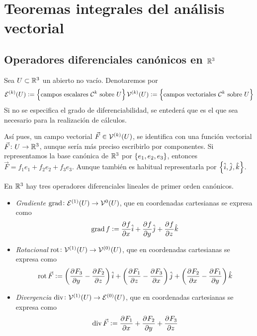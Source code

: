 \chapter{Teoremas integrales del análisis vectorial}

\section{Operadores diferenciales canónicos en $\mathbb{R}^3$}

\begin{obs}
    Sea $U \subset \mathbb{R}^3$ un abierto no vacío. Denotaremos por
    \begin{gather*}
        \mathcal{E}^{(k)} (U) := \left\{\text{campos escalares $\mathcal{C}^k$ sobre $U$}\right\}
        \mathcal{V}^{(k)}(U) := \left\{\text{campos vectoriales $\mathcal{C}^k$ sobre $U$}\right\}
    \end{gather*}
    Si no se especifica el grado de diferenciabilidad, se entederá que es el que sea necesario para la realización
    de cálculos.

    Así pues, un campo vectorial $\vec{F} \in \mathcal{V}^{\left( k \right)}(U)$, se identifica con una función vectorial
    $\vec{F} \colon U \to \mathbb{R}^3$, aunque sería más preciso escribirlo por componentes. Si representamos
    la base canónica de $\mathbb{R}^3$ por $\left\{e_1, e_2, e_3\right\}$, entonces $\vec{F} = f_1e_1 + f_2e_2 + f_3e_3$.
    Aunque tambi\'en es habitual representarla por $\left\{\hat{i}, \hat{j}, \hat{k}\right\}$.
\end{obs}

\begin{defi}
    En $\mathbb{R}^3$ hay tres operadores diferenciales lineales de primer orden canónicos.
    \begin{itemize}
 
        \item \emph{Gradiente} $\operatorname{grad} \colon \mathcal{E}^{(1)}(U) \to \mathcal{V}^{0}(U)$, que en coordenadas cartesianas
            se expresa como
            \[
                \operatorname{grad} f := \frac{\partial^{} f}{\partial x^{}} \hat{i} + \frac{\partial^{} f}{\partial y^{}} \hat{j} + \frac{\partial^{} f}{\partial z^{}} \hat{k}
            \]
        \item \emph{Rotacional} $\operatorname{rot} \colon \mathcal{V}^{(1)} (U) \to \mathcal{V}^{(0)}(U)$, que en coordenadas cartesianas
            se expresa como
            \[
                \operatorname{rot} \vec{F} := \left( \frac{\partial^{} F_3}{\partial y^{}} - \frac{\partial^{} F_2}{\partial z^{}} \right)\hat{i} +
                \left( \frac{\partial^{} F_1}{\partial z^{}} - \frac{\partial^{} F_3}{\partial x^{}} \right) \hat{j} + \left( \frac{\partial^{} F_2}{\partial x^{}} - \frac{\partial^{} F_1}{\partial y^{}} \right) \hat{k}
            \]
        \item \emph{Divergencia} $\operatorname{div} \colon \mathcal{V}^{(1)} (U) \to \mathcal{E}^{(0)} (U)$, que en coordenadas cartesianas
            se expresa como
            \[
                \operatorname{div} \vec{F} := \frac{\partial^{} F_1}{\partial x^{}} + \frac{\partial^{} F_2}{\partial y^{}} + \frac{\partial^{} F_3}{\partial z^{}}
            \]
    \end{itemize}
\end{defi}


